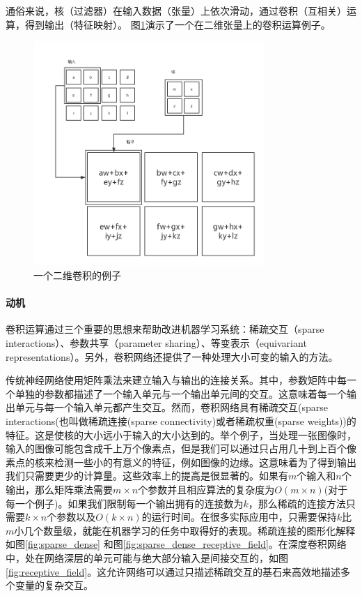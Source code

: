 \documentclass[12pt,a4paper,titlepage]{article}
\begin{document}
通俗来说，核（过滤器）在输入数据（张量）上依次滑动，通过卷积（互相关）运算，得到输出（特征映射）。
图\ref{fig:conv}演示了一个在二维张量上的卷积运算例子。
\begin{figure}[ht]

\centering
\includegraphics[height=8.5cm]{img/convolution.png}
\caption{一个二维卷积的例子}
\label{fig:conv}
\end{figure}

\paragraph{动机}
卷积运算通过三个重要的思想来帮助改进机器学习系统：稀疏交互（sparse interactions）、参数共享（parameter sharing）、等变表示（equivariant representations）。另外，卷积网络还提供了一种处理大小可变的输入的方法。\par
传统神经网络使用矩阵乘法来建立输入与输出的连接关系。其中，参数矩阵中每一个单独的参数都描述了一个输入单元与一个输出单元间的交互。这意味着每一个输出单元与每一个输入单元都产生交互。然而，卷积网络具有稀疏交互(sparse interactions(也叫做稀疏连接(sparse connectivity)或者稀疏权重(sparse weights))的特征。这是使核的大小远小于输入的大小达到的。举个例子，当处理一张图像时，输入的图像可能包含成千上万个像素点，但是我们可以通过只占用几十到上百个像素点的核来检测一些小的有意义的特征，例如图像的边缘。这意味着为了得到输出我们只需要更少的计算量。这些效率上的提高是很显著的。如果有$m$个输入和$n$个输出，那么矩阵乘法需要$m \times n$个参数并且相应算法的复杂度为$O(m \times n)$(对于每一个例子)。如果我们限制每一个输出拥有的连接数为$k$，那么稀疏的连接方法只需要$k \times n$个参数以及$O(k\times n)$的运行时间。在很多实际应用中，只需要保持$k$比$m$小几个数量级，就能在机器学习的任务中取得好的表现。稀疏连接的图形化解释如图\ref{fig:sparse_dense} 和图\ref{fig:sparse_dense_receptive_field}。在深度卷积网络中，处在网络深层的单元可能与绝大部分输入是间接交互的，如图\ref{fig:receptive_field}。这允许网络可以通过只描述稀疏交互的基石来高效地描述多个变量的复杂交互。
\end{document}
